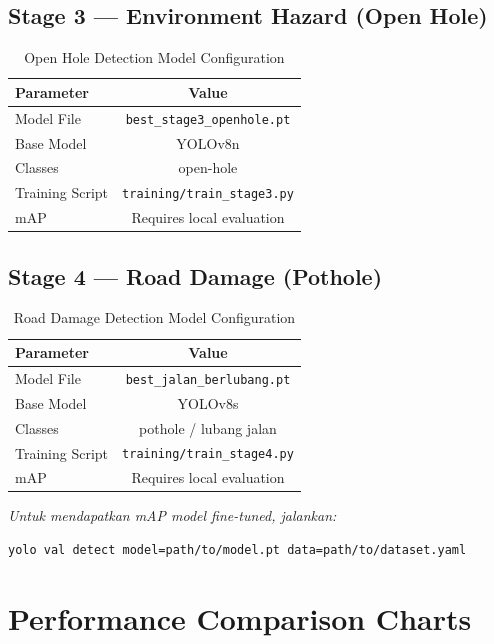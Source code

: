 \documentclass[12pt,a4paper]{article}
\begin{document}
\subsection{Stage 3 — Environment Hazard (Open Hole)}

\begin{table}[H]
\centering
\caption{Open Hole Detection Model Configuration}
\begin{tabular}{@{}lc@{}}
\toprule
\textbf{Parameter} & \textbf{Value} \\
\midrule
Model File & \texttt{best\_stage3\_openhole.pt} \\
Base Model & YOLOv8n \\
Classes & open-hole \\
Training Script & \texttt{training/train\_stage3.py} \\
mAP & Requires local evaluation \\
\bottomrule
\end{tabular}
\end{table}

\subsection{Stage 4 — Road Damage (Pothole)}

\begin{table}[H]
\centering
\caption{Road Damage Detection Model Configuration}
\begin{tabular}{@{}lc@{}}
\toprule
\textbf{Parameter} & \textbf{Value} \\
\midrule
Model File & \texttt{best\_jalan\_berlubang.pt} \\
Base Model & YOLOv8s \\
Classes & pothole / lubang jalan \\
Training Script & \texttt{training/train\_stage4.py} \\
mAP & Requires local evaluation \\
\bottomrule
\end{tabular}
\end{table}

\noindent\textit{Untuk mendapatkan mAP model fine-tuned, jalankan:}
\begin{verbatim}
yolo val detect model=path/to/model.pt data=path/to/dataset.yaml
\end{verbatim}

\section{Performance Comparison Charts}
\end{document}
